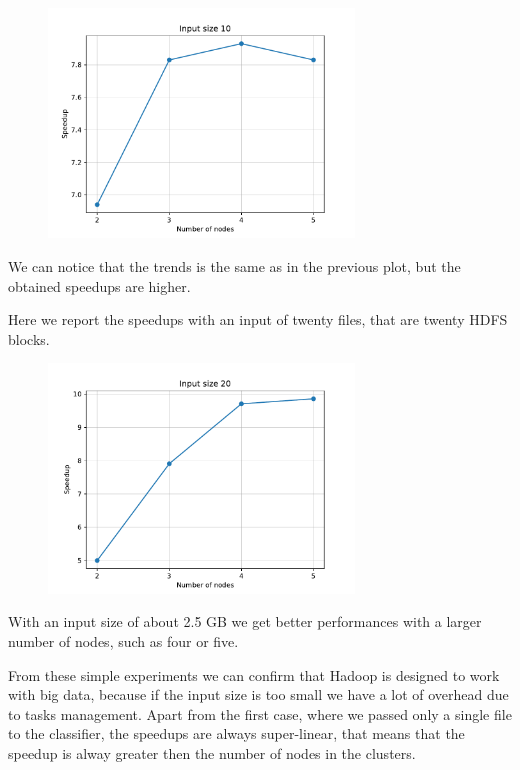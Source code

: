 \documentclass[10pt,twocolumn,letterpaper]{article}
\begin{document}
\begin{figure}[H]
\centering
\includegraphics[width=3.2in]{fig/speedup10}
\end{figure}

We can notice that the trends is the same as in the previous plot, but the obtained speedups are higher.

Here we report the speedups with an input of twenty files, that are twenty HDFS blocks.

\begin{figure}[H]
\centering
\includegraphics[width=3.2in]{fig/speedup20}
\end{figure}

With an input size of about 2.5 GB we get better performances with a larger number of nodes, such as four or five.

From these simple experiments we can confirm that Hadoop is designed to work with big data, because if the input size is too small we have a lot of overhead due to tasks management. Apart from the first case, where we passed only a single file to the classifier, the speedups are always super-linear, that means that the speedup is alway greater then the number of nodes in the clusters.
\end{document}
